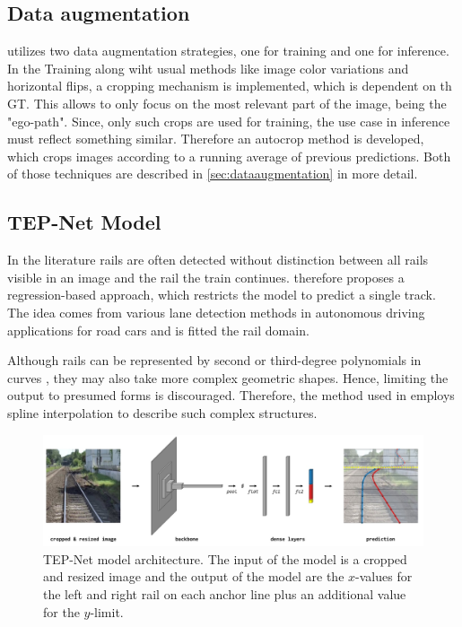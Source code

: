 \subsection{Data augmentation}

\cite{tepNet2024} utilizes two data augmentation strategies, one for training and one for inference.
In the Training along wiht usual methods like image color variations and horizontal flips, a cropping mechanism is implemented, which is dependent on th \ac{GT}.
This allows to only focus on the most relevant part of the image, being the "ego-path".
Since, only such crops are used for training, the use case in inference must reflect something similar.
Therefore an autocrop method is developed, which crops images according to a running average of previous predictions.
Both of those techniques are described in \autoref{sec:dataaugmentation} in more detail.


\subsection{TEP-Net Model}

In the literature rails are often detected without distinction between all rails visible in an image and the rail the train continues.
\cite{tepNet2024} therefore proposes a regression-based approach, which restricts the model to predict a single track.
The idea comes from various lane detection methods in autonomous driving applications for road cars and is fitted the rail domain.

Although rails can be represented by second or third-degree polynomials in curves \cite{PolyLaneNetRoad2021}, they may also take more complex geometric shapes.
Hence, limiting the output to presumed forms is discouraged.
Therefore, the method used in \cite{tepNet2024} employs spline interpolation to describe such complex structures.

\begin{figure}[H]
    \centering
    \includegraphics[width=\linewidth]{PICs/Baselinepaper/TEP-Net_model.jpg}
    \caption{\ac{TEP}-Net model architecture\cite{tepNet2024}. The input of the model is a cropped and resized image and the output of the model are the $x$-values for the left and right rail on each anchor line plus an additional value for the $y$-limit.}
    \label{fig:TEP-Net_model}
\end{figure}


